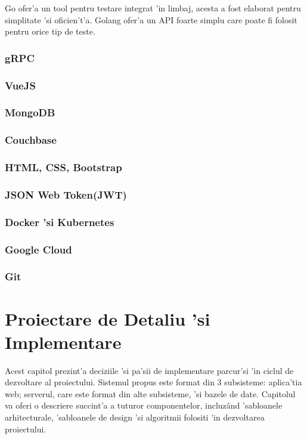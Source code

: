 \documentclass[12pt,a4paper,twoside]{report}
\begin{document}
Go ofer'a un tool pentru testare integrat 'in limbaj, acesta a fost elaborat pentru simplitate 'si oficien't'a. Golang ofer'a un API foarte simplu care poate fi folosit pentru orice tip de teste.



\subsection{gRPC}
\subsection{VueJS}
\subsection{MongoDB}
\subsection{Couchbase}
\subsection{HTML, CSS, Bootstrap}
\subsection{JSON Web Token(JWT)}
\subsection{Docker 'si Kubernetes}
\subsection{Google Cloud}
\subsection{Git}

\chapter{Proiectare de Detaliu 'si Implementare}
Acest capitol prezint'a deciziile 'si pa'sii de implementare parcur'si 'in ciclul de dezvoltare al proiectului. Sistemul propus este format din 3 subsisteme: aplica'tia web; serverul, care este format din alte subsisteme, 'si bazele de date. Capitolul va oferi o descriere succint'a a tuturor componentelor, incluzând 'sabloanele arhitecturale, 'sabloanele de design 'si algoritmii folositi 'in dezvoltarea proiectului.
\end{document}
